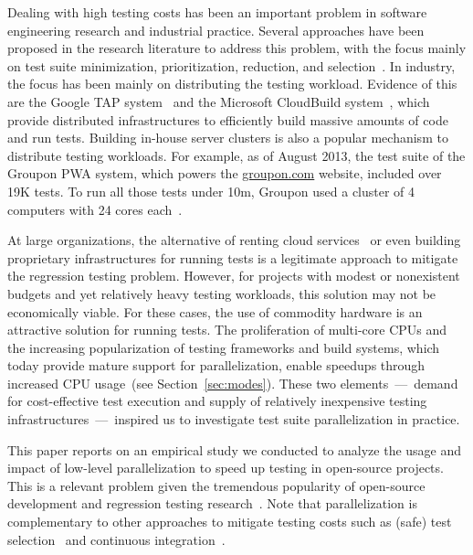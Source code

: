 Dealing with high testing costs has been an important problem in
software engineering research and industrial practice.  Several
approaches have been proposed in the research literature to address
this problem, with the focus mainly on test suite minimization,
prioritization, reduction, and selection~\cite{yoo-harman-stvr2012}.
In industry, the focus has been mainly on distributing the testing
workload.  Evidence of this are the Google TAP
system~\citet{google-tap,google-ci} and the Microsoft CloudBuild
system~\citet{prasad-shulte-ieee-microsoft-ci}, which provide
distributed infrastructures to efficiently build massive amounts of
code and run tests.  Building in-house server clusters is also a
popular mechanism to distribute testing workloads.  For example, as of
August 2013, the test suite of the Groupon PWA system, which powers
the \url{groupon.com} website, included over 19K tests.  To run all
those tests under 10m, Groupon used a cluster of 4 computers with 24
cores each~\citet{kim-etal-fse2013}.

At large organizations, the alternative of renting cloud
services~\citet{cloud-services} or even building proprietary
infrastructures for running tests is a legitimate approach to mitigate
the regression testing problem.  However, for projects with modest
 or nonexistent budgets and yet relatively heavy testing workloads, this solution may
not be economically viable.  For these cases, the use of commodity
hardware is an attractive
solution for running tests.  The proliferation of
multi-core CPUs and the increasing popularization of testing
frameworks and build systems, which today provide mature support for
parallelization, enable speedups through increased CPU
usage~(see Section~\ref{sec:modes}).  These two elements~---~demand
for cost-effective test execution and supply of relatively inexpensive
testing infrastructures~---~inspired us to investigate 
test suite parallelization in practice.

This paper reports on an empirical study we conducted to analyze the
usage and impact of low-level parallelization to speed up testing in
open-source projects.  This is a relevant problem given the tremendous
popularity of open-source development and regression testing
research~\citet{yoo-harman-stvr2012}.  Note that parallelization is
complementary to other approaches to mitigate testing costs such as
(safe) test
selection~\citet{Rothermel:1997:SER:248233.248262,gligoric-etal-issta2015}
and continuous integration~\citet{Saff:2003:RWD:951952.952340}.

